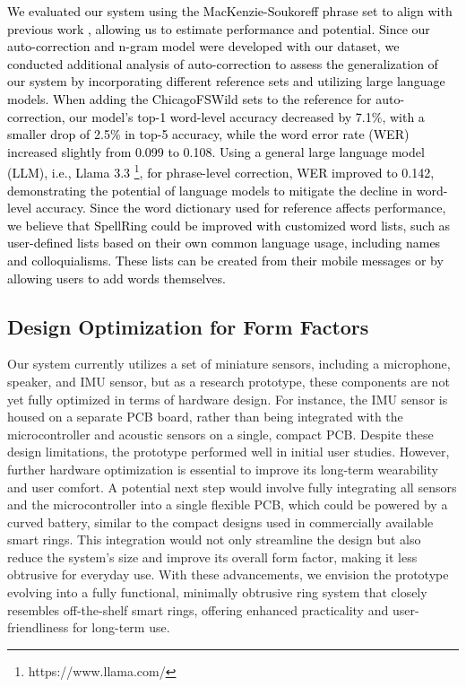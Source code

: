 \textcolor{black}{We evaluated our system using the MacKenzie-Soukoreff phrase set \cite{mackenzie2003phrase} to align with previous work \cite{martin2023fingerspeller}, allowing us to estimate performance and potential. Since our auto-correction and n-gram model were developed with our dataset, we conducted additional analysis of auto-correction to assess the generalization of our system by incorporating different reference sets and utilizing large language models. When adding the ChicagoFSWild sets \cite{shi2019fingerspelling, shi2018american} to the reference for auto-correction, our model's top-1 word-level accuracy decreased by 7.1\%, with a smaller drop of 2.5\% in top-5 accuracy, while the word error rate (WER) increased slightly from 0.099 to 0.108. Using a general large language model (LLM), i.e., Llama 3.3 \footnote{https://www.llama.com/}, for phrase-level correction, WER improved to 0.142, demonstrating the potential of language models to mitigate the decline in word-level accuracy. Since the word dictionary used for reference affects performance, we believe that SpellRing could be improved with customized word lists, such as user-defined lists based on their own common language usage, including names and colloquialisms. These lists can be created from their mobile messages or by allowing users to add words themselves.}


 





\subsection{Design Optimization for Form Factors}

Our system currently utilizes a set of miniature sensors, including a microphone, speaker, and IMU sensor, but as a research prototype, these components are not yet fully optimized in terms of hardware design. For instance, the IMU sensor is housed on a separate PCB board, rather than being integrated with the microcontroller and acoustic sensors on a single, compact PCB. Despite these design limitations, the prototype performed well in initial user studies. However, further hardware optimization is essential to improve its long-term wearability and user comfort. A potential next step would involve fully integrating all sensors and the microcontroller into a single flexible PCB, which could be powered by a curved battery, similar to the compact designs used in commercially available smart rings. This integration would not only streamline the design but also reduce the system's size and improve its overall form factor, making it less obtrusive for everyday use. With these advancements, we envision the prototype evolving into a fully functional, minimally obtrusive ring system that closely resembles off-the-shelf smart rings, offering enhanced practicality and user-friendliness for long-term use.


